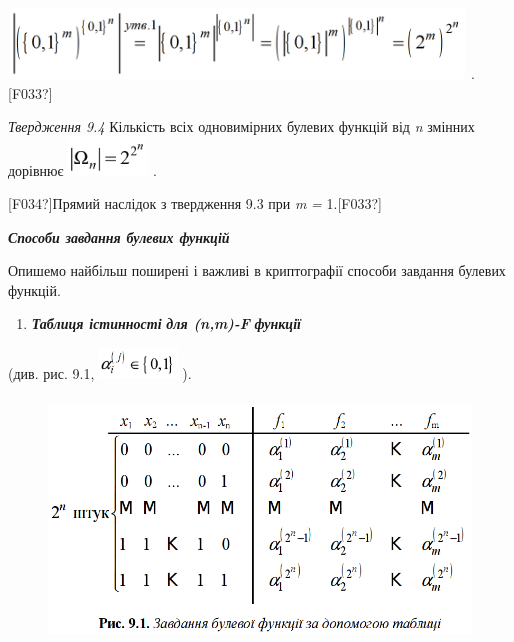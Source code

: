 \documentclass[a4paper]{article}
\newcommand\liststyleWWviiiNumlii{%
\renewcommand\theenumi{\arabic{enumi}}
\renewcommand\theenumii{\arabic{enumii}}
\renewcommand\theenumiii{\arabic{enumiii}}
\renewcommand\theenumiv{\arabic{enumiv}}
\renewcommand\labelenumi{\theenumi.}
\renewcommand\labelenumii{\theenumii.}
\renewcommand\labelenumiii{\theenumiii.}
\renewcommand\labelenumiv{\theenumiv.}
}
\newcounter{}
\begin{document}
{\centering
 \includegraphics[width=4.7756in,height=0.7402in]{crypt-img/crypt-img98.png}
.\textlatin{[F033?]}
\par}


\bigskip


\bigskip


\bigskip

\textit{Твердження 9.4}  Кількість  всіх одновимірних булевих функцій від
\textit{n }змінних дорівнює  
\includegraphics[width=0.8339in,height=0.4016in]{crypt-img/crypt-img99.png} .

\textlatin{[F034?]}Прямий наслідок з твердження 9.3 при  \textit{m}\textit{ =
}1.\textlatin{[F033?]}


\bigskip


\bigskip

{\centering\bfseries\itshape
Способи завдання булевих функцій
\par}


\bigskip

Опишемо найбільш поширені і важливі в криптографії способи завдання булевих
функцій.


\bigskip

\liststyleWWviiiNumlii
\begin{enumerate}
\item \textbf{\textit{Таблиця істинності}} \textbf{\textit{для 
(}}\textbf{\textit{n}}\textbf{\textit{,}}\textbf{\textit{m}}\textbf{\textit{)-}}\textbf{\textit{F}}\textbf{\textit{
 функції}}
\end{enumerate}
 (див. рис. 9.1, 
\includegraphics[width=0.8189in,height=0.3189in]{crypt-img/crypt-img100.png} ).


\bigskip



\begin{figure}
\centering
\includegraphics[width=5.0043in,height=2.5457in]{crypt-img/crypt-img101.png}
\end{figure}
\end{document}
